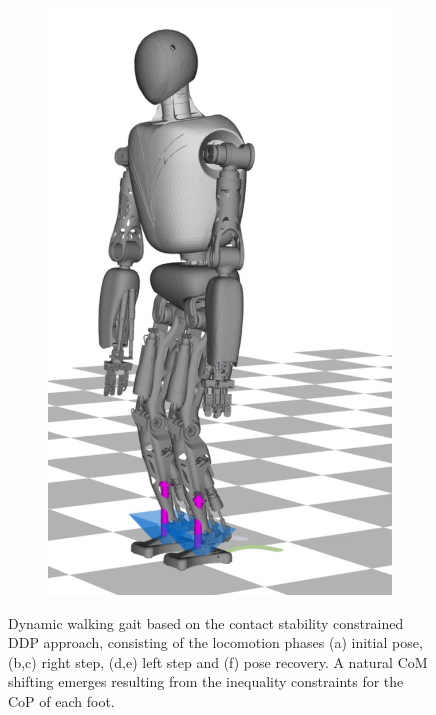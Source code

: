\begin{figure}
\begin{subfigure}{.16\textwidth}
	\includegraphics[width=1\linewidth]{fig/walkDynamic/snaps/8}
	\caption{}
\end{subfigure}
\caption[Dynamic walking based on the contact stability constrained \gls{DDP}]{Dynamic walking gait based on the contact stability constrained \gls{DDP} approach, consisting of the locomotion phases (a) initial pose, (b,c) right step, (d,e) left step and (f) pose recovery. A natural \gls{CoM} shifting emerges resulting from the inequality constraints for the \gls{CoP} of each foot.}
\label{fig:walkDynamic_Snaps}
\end{figure}

